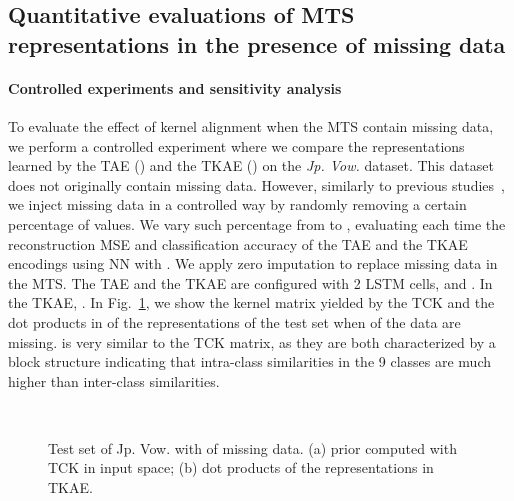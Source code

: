 \documentclass[a4paper,10pt,pdftex]{article}
\begin{document}
\subsection{Quantitative evaluations of MTS representations in the presence of missing data}
\label{sec:missing_data}

\paragraph{\textbf{Controlled experiments and sensitivity analysis}}
To evaluate the effect of kernel alignment when the MTS contain missing data, we perform a controlled experiment where we compare the representations learned by the TAE () and the TKAE () on the \textit{Jp. Vow.} dataset.
This dataset does not originally contain missing data. However, similarly to previous studies~\cite{Baydogan2016, mikalsen2017time}, we inject missing data in a controlled way by randomly removing a certain percentage of values.
We vary such percentage from  to , evaluating each time the reconstruction MSE and classification accuracy of the TAE and the TKAE encodings using NN with .
We apply zero imputation to replace missing data in the MTS. The TAE and the TKAE are configured with 2 LSTM cells,  and . In the TKAE, .
In Fig.~\ref{fig:alignment}, we show the kernel matrix  yielded by the TCK and the dot products in  of the representations of the test set when  of the data are missing.
 is very similar to the TCK matrix, as they are both characterized by a block structure indicating that intra-class similarities in the 9 classes are much higher than inter-class similarities.
\begin{figure}[th!]
	\centering
~
\caption{Test set of Jp. Vow. with  of missing data. (a) prior  computed with TCK in input space; 
(b) dot products  of the representations in TKAE.}
	\label{fig:alignment}
\end{figure}
\end{document}
